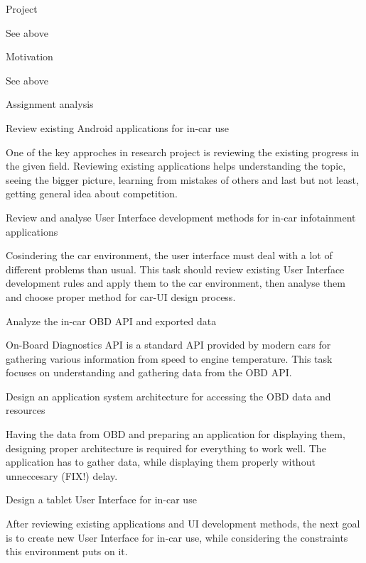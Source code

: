 \sec Project

See above

\secc Motivation

See above

\sec Assignment analysis

\secc Review existing Android applications for in-car use

One of the key approches in research project is reviewing the existing progress in the given field. Reviewing existing applications helps understanding the topic, seeing the bigger picture, learning from mistakes of others and last but not least, getting general idea about competition.

\secc Review and analyse User Interface development methods for in-car infotainment applications

Cosindering the car environment, the user interface must deal with a lot of different problems than usual. This task should review existing User Interface development rules and apply them to the car environment, then analyse them and choose proper method for car-UI design process.

\secc Analyze the in-car OBD API and exported data

On-Board Diagnostics API is a standard API provided by modern cars for gathering various information from speed to engine temperature. This task focuses on understanding and gathering data from the OBD API.

\secc Design an application system architecture for accessing the OBD data and resources

Having the data from OBD and preparing an application for displaying them, designing proper architecture is required for everything to work well. The application has to gather data, while displaying them properly without unneccesary (FIX!) delay.

\secc Design a tablet User Interface for in-car use

After reviewing existing applications and UI development methods, the next goal is to create new User Interface for in-car use, while considering the constraints this environment puts on it.

